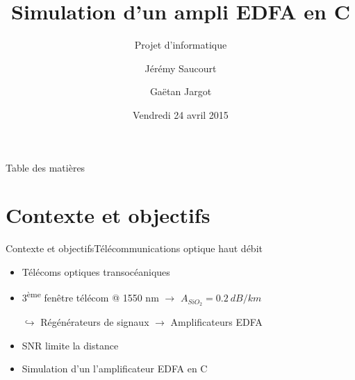 \documentclass{beamer}
\title{Simulation d'un ampli EDFA en C}
\subtitle{Projet d'informatique}
\author{Jérémy Saucourt \and Gaëtan Jargot}
\date{Vendredi 24 avril 2015}
\begin{document}
{
\begin{frame}
  \titlepage
\end{frame}
}


\begin{frame}{Table des matières}
  \tableofcontents
\end{frame}


\section{Contexte et objectifs}
\begin{frame}{Contexte et objectifs}{Télécommunications optique haut débit}
  
  \begin{itemize}
  \item Télécoms optiques transocéaniques
  \item 3\textsuperscript{ème} fenêtre télécom @ 1550 nm $\rightarrow$ $A_{SiO_{2}} = 0.2~dB/km$
  \item[$\hookrightarrow$] Régénérateurs de signaux $\rightarrow$ Amplificateurs EDFA
  \item SNR limite la distance
  \end{itemize}
  
  \begin{itemize}
  \item Simulation d'un l'amplificateur EDFA en C
  \end{itemize}
  
\end{frame}
\end{document}
